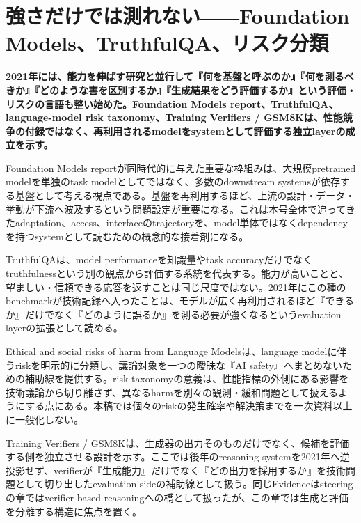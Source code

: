 \section{強さだけでは測れない――Foundation Models、TruthfulQA、リスク分類}
\label{pkg:evaluation-risk-foundation}
\noindent\textbf{2021年には、能力を伸ばす研究と並行して『何を基盤と呼ぶのか』『何を測るべきか』『どのような害を区別するか』『生成結果をどう評価するか』という評価・リスクの言語も整い始めた。Foundation Models report、TruthfulQA、language-model risk taxonomy、Training Verifiers / GSM8Kは、性能競争の付録ではなく、再利用されるmodelをsystemとして評価する独立layerの成立を示す。}\autocite{src-20fd9bba2e7a,src-34f845c1e710,src-750bc3eeb1bc,src-8536f9ceae6d,src-c16f4ae139bf,src-d9549fe4ff37}

Foundation Models reportが同時代的に与えた重要な枠組みは、大規模pretrained modelを単独のtask modelとしてではなく、多数のdownstream systemsが依存する基盤として考える視点である。基盤を再利用するほど、上流の設計・データ・挙動が下流へ波及するという問題設定が重要になる。これは本号全体で追ってきたadaptation、access、interfaceのtrajectoryを、model単体ではなくdependencyを持つsystemとして読むための概念的な接着剤になる。\autocite{src-d9549fe4ff37}


TruthfulQAは、model performanceを知識量やtask accuracyだけでなくtruthfulnessという別の観点から評価する系統を代表する。能力が高いことと、望ましい・信頼できる応答を返すことは同じ尺度ではない。2021年にこの種のbenchmarkが技術記録へ入ったことは、モデルが広く再利用されるほど『できるか』だけでなく『どのように誤るか』を測る必要が強くなるというevaluation layerの拡張として読める。\autocite{src-8536f9ceae6d,src-c16f4ae139bf}


Ethical and social risks of harm from Language Modelsは、language modelに伴うriskを明示的に分類し、議論対象を一つの曖昧な『AI safety』へまとめないための補助線を提供する。risk taxonomyの意義は、性能指標の外側にある影響を技術議論から切り離さず、異なるharmを別々の観測・緩和問題として扱えるようにする点にある。本稿では個々のriskの発生確率や解決策までを一次資料以上に一般化しない。\autocite{src-20fd9bba2e7a}


Training Verifiers / GSM8Kは、生成器の出力そのものだけでなく、候補を評価する側を独立させる設計を示す。ここでは後年のreasoning systemを2021年へ逆投影せず、verifierが『生成能力』だけでなく『どの出力を採用するか』を技術問題として切り出したevaluation-sideの補助線として扱う。同じEvidenceはsteeringの章ではverifier-based reasoningへの橋として扱ったが、この章では生成と評価を分離する構造に焦点を置く。\autocite{src-34f845c1e710,src-750bc3eeb1bc}


